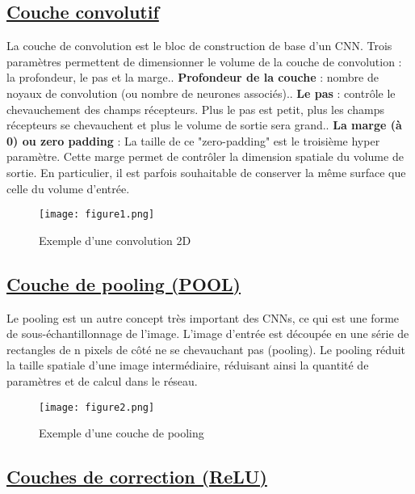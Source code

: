 \documentclass[11pt]{article}
\begin{document}
\subsection{\underline{Couche convolutif}}

La couche de convolution est le bloc de construction de base d'un CNN. Trois paramètres permettent de
dimensionner le volume de la couche de convolution : la profondeur, le pas et la marge.\newline{}. \textbf{Profondeur de la couche } : nombre de noyaux de convolution (ou nombre de neurones associés).\newline{}. \textbf{Le pas} : contrôle le chevauchement des champs récepteurs. Plus le pas est petit, plus les champs
récepteurs se chevauchent et plus le volume de sortie sera grand.\newline{}. \textbf{La marge (à 0) ou zero padding } : La taille de ce "zero-padding" est le troisième hyper paramètre. Cette marge permet de contrôler la dimension spatiale du volume de sortie. En particulier, il est parfois souhaitable de conserver la même surface que celle du volume d'entrée.
\begin{figure}[h]
\centering
\texttt{[image: figure1.png]}
\caption{Exemple d’une convolution 2D}
\label{fig:figure1}
\end{figure}
\subsection{\underline{Couche de pooling (POOL)}}

Le pooling est un autre concept très important des CNNs, ce qui est une forme de sous-échantillonnage de l'image. L'image d'entrée est découpée en une série de rectangles de n pixels de côté ne se chevauchant pas (pooling). Le pooling réduit la taille spatiale d'une image intermédiaire, réduisant ainsi la quantité de paramètres et de calcul dans le réseau.

\begin{figure}[h]
\centering
\texttt{[image: figure2.png]}
\caption{Exemple d’une couche de pooling}
\label{fig:figure2}
\end{figure}

\subsection{\underline{Couches de correction (ReLU)}}
\end{document}
